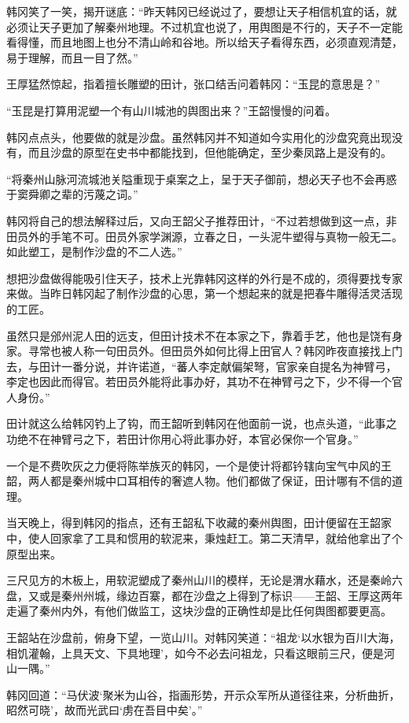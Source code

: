 韩冈笑了一笑，揭开谜底：“昨天韩冈已经说过了，要想让天子相信机宜的话，就必须让天子更加了解秦州地理。不过机宜也说了，用舆图是不行的，天子不一定能看得懂，而且地图上也分不清山岭和谷地。所以给天子看得东西，必须直观清楚，易于理解，而且一目了然。”

王厚猛然惊起，指着擅长雕塑的田计，张口结舌问着韩冈：“玉昆的意思是？”

“玉昆是打算用泥塑一个有山川城池的舆图出来？”王韶慢慢的问着。

韩冈点点头，他要做的就是沙盘。虽然韩冈并不知道如今实用化的沙盘究竟出现没有，而且沙盘的原型在史书中都能找到，但他能确定，至少秦凤路上是没有的。

“将秦州山脉河流城池关隘重现于桌案之上，呈于天子御前，想必天子也不会再惑于窦舜卿之辈的污蔑之词。”

韩冈将自己的想法解释过后，又向王韶父子推荐田计，“不过若想做到这一点，非田员外的手笔不可。田员外家学渊源，立春之日，一头泥牛塑得与真物一般无二。如此塑工，是制作沙盘的不二人选。”

想把沙盘做得能吸引住天子，技术上光靠韩冈这样的外行是不成的，须得要找专家来做。当昨日韩冈起了制作沙盘的心思，第一个想起来的就是把春牛雕得活灵活现的工匠。

虽然只是邠州泥人田的远支，但田计技术不在本家之下，靠着手艺，他也是饶有身家。寻常也被人称一句田员外。但田员外如何比得上田官人？韩冈昨夜直接找上门去，与田计一番分说，并许诺道，“蕃人李定献偏架弩，官家亲自提名为神臂弓，李定也因此而得官。若田员外能将此事办好，其功不在神臂弓之下，少不得一个官人身份。”

田计就这么给韩冈钓上了钩，而王韶听到韩冈在他面前一说，也点头道，“此事之功绝不在神臂弓之下，若田计你用心将此事办好，本官必保你一个官身。”

一个是不费吹灰之力便将陈举族灭的韩冈，一个是使计将都钤辖向宝气中风的王韶，两人都是秦州城中口耳相传的奢遮人物。他们都做了保证，田计哪有不信的道理。

当天晚上，得到韩冈的指点，还有王韶私下收藏的秦州舆图，田计便留在王韶家中，使人回家拿了工具和惯用的软泥来，秉烛赶工。第二天清早，就给他拿出了个原型出来。

三尺见方的木板上，用软泥塑成了秦州山川的模样，无论是渭水藉水，还是秦岭六盘，又或是秦州州城，缘边百寨，都在沙盘之上得到了标识——王韶、王厚这两年走遍了秦州内外，有他们做监工，这块沙盘的正确性却是比任何舆图都要更高。

王韶站在沙盘前，俯身下望，一览山川。对韩冈笑道：“祖龙‘以水银为百川大海，相饥灌翰，上具天文、下具地理’，如今不必去问祖龙，只看这眼前三尺，便是河山一隅。”

韩冈回道：“马伏波‘聚米为山谷，指画形势，开示众军所从道径往来，分析曲折，昭然可晓’，故而光武曰‘虏在吾目中矣’。”

